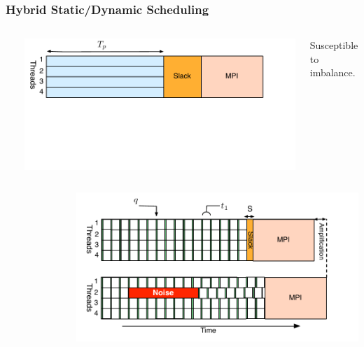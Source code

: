 \begin{frame}[label=hybridstatdyn]
\frametitle{Hybrid Static/Dynamic Scheduling}
\begin{columns}
  \vspace*{-0.2in}
\begin{lstlisting}
  
  \end{lstlisting}
 \vspace*{-0.2in}
  \begin{center}
    \includegraphics[scale=0.31]{images/threadedCompRegion-static}
  \end{center} 
  \vspace*{-0.4in}
  \begin{center} 
    \tiny Susceptible to imbalance.  
  \end{center} 
\end{columns}
\begin{columns}
\vspace*{-0.15in}
\begin{figure}

\end{figure}
  \begin{center}
    \includegraphics[scale=0.31]{images/threadedCompRegion-dynamic}

\end{center}
\end{columns}
\end{frame}
